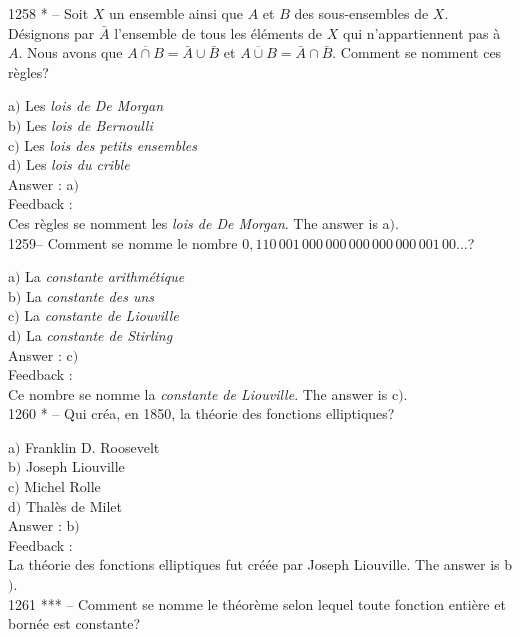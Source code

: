 ﻿\documentclass[letterpaper, 12pt]{article}
\begin{document}
1258 * -- Soit $X$ un ensemble ainsi que $A$ et $B$ des
sous-ensembles de $X$. D\'esignons par $\bar A$ l'ensemble de tous
les \'el\'ements de $X$ qui n'appartiennent pas \`a $A$. Nous avons
que $\overline{A\cap B}=\bar A\cup\bar B$ et $\overline{A\cup
B}=\bar A\cap\bar B$. Comment se nomment ces r\`egles?

a$)$ Les {\sl lois de De Morgan} \\
b$)$ Les {\sl lois de Bernoulli} \\
c$)$ Les {\sl lois des petits ensembles} \\
d$)$ Les {\sl lois du crible}\\

Answer : a$)$\\

Feedback : \\
Ces r\`egles se nomment les {\sl lois de De Morgan}.
The answer is a$)$.\\

1259-- Comment se nomme le nombre
$0,110\,001\,000\,000\,000\,000\,000\,001\,00\ldots$?

a$)$ La {\sl constante arithm\'etique} \\
b$)$ La {\sl constante des uns} \\
c$)$ La {\sl constante de Liouville} \\
d$)$ La {\sl constante de Stirling}\\

Answer : c$)$\\

Feedback : \\
Ce nombre se nomme la {\sl constante de Liouville}.
The answer is c$)$.\\

1260 * -- Qui cr\'ea, en 1850, la th\'eorie des fonctions
elliptiques?

a$)$ Franklin D. Roosevelt \\
b$)$ Joseph Liouville \\
c$)$ Michel Rolle \\
d$)$ Thal\`es de Milet\\

Answer : b$)$\\

Feedback : \\
La th\'eorie des fonctions elliptiques fut cr\'e\'ee par Joseph
Liouville.
The answer is b$)$.\\

1261 *** -- Comment se nomme le th\'eor\`eme selon lequel toute
fonction enti\`ere et born\'ee est constante?
\end{document}
